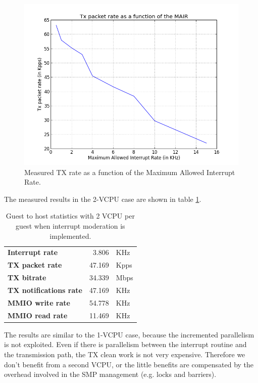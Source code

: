 \begin{figure}[bt]
\centering
\includegraphics[scale = 0.7]{MAIR-vs-TXRate.png}
\caption{Measured TX rate as a function of the Maximum Allowed Interrupt Rate.}
\label{fig:itr-vs-txrate}
\end{figure}

\vspace{0.5cm}

The measured results in the 2-VCPU case are shown in table \ref{tab:e1000-mit-tx-g2h2vcpu}.

\begin{table}
\begin{center}
\begin{tabular}{lrl}
\toprule
\textbf{Interrupt rate} & 3.806 & KHz\\
\textbf{TX packet rate} & 47.169 & Kpps\\
\textbf{TX bitrate} & 34.339 & Mbps\\
\textbf{TX notifications rate} & 47.169 & KHz\\
\textbf{MMIO write rate} & 54.778 & KHz\\
\textbf{MMIO read rate} & 11.469 & KHz\\
\bottomrule
\end{tabular}
\end{center}
\caption{Guest to host statistics with 2 VCPU per guest when interrupt moderation is implemented.}
\label{tab:e1000-mit-tx-g2h2vcpu}
\end{table}

The results are similar to the 1-VCPU case, because the incremented parallelism is not exploited. Even if there is parallelism
between the interrupt routine and the transmission path, the TX clean work is not very expensive. Therefore we don't benefit from a second 
VCPU, or the little benefits are compensated by the overhead involved in the SMP management (e.g. locks and barriers).


